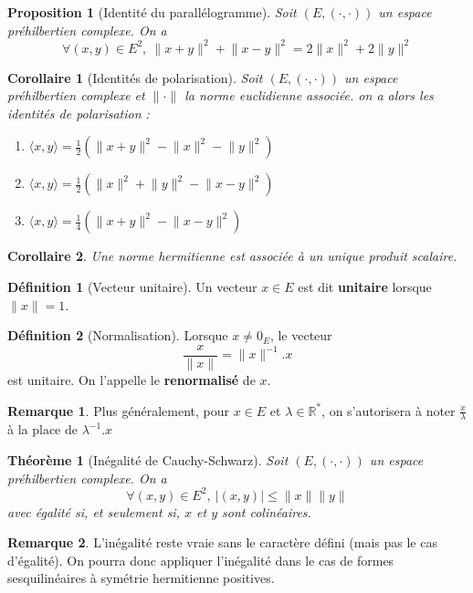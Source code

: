 \documentclass[french]{article}
\newcommand{\R}{\mathbb{R}}
\newcommand{\st}{^*}
\newcommand{\inv}{^{-1}}
\theoremstyle{plain}
\newtheorem{thm}{Théorème}
\newtheorem{prop}{Proposition}
\newtheorem{cor}{Corollaire}
\theoremstyle{definition}
\newtheorem{dfn}{Définition}
\newtheorem{rmq}{Remarque}
\begin{document}
\begin{prop}[Identité du parallélogramme]
	Soit $(E,(\cdot,\cdot))$ un espace préhilbertien complexe. On a $$\forall (x,y)\in E^2,\ \lVert x+y\rVert^2+\lVert x-y\rVert^2=2\lVert x\rVert^2+2\lVert y\rVert^2$$
\end{prop}
\begin{cor}[Identités de polarisation]
	Soit $(E,(\cdot,\cdot))$ un espace préhilbertien complexe et $\lVert\cdot\rVert$ la norme euclidienne associée. on a alors les identités de polarisation :
	\begin{enumerate}
		\item $\displaystyle \langle x,y\rangle =\frac12\left(\lVert x+y\rVert^2-\lVert x\rVert^2-\lVert y\rVert^2\right)$
		\item $\displaystyle \langle x,y\rangle =\frac12\left(\lVert x\rVert^2+\lVert y\rVert^2-\lVert x-y\rVert^2\right)$
		\item $\displaystyle \langle x,y\rangle =\frac14\left(\lVert x+y\rVert^2-\lVert x-y\rVert^2\right)$
	\end{enumerate}
\end{cor}
\begin{cor}
	Une  norme hermitienne est associée à un unique produit scalaire.
\end{cor}
\begin{dfn}[Vecteur unitaire]
	Un vecteur $x\in E$ est dit \textbf{unitaire} lorsque $\lVert x\rVert=1$.
\end{dfn}
\begin{dfn}[Normalisation]
	Lorsque $x\ne 0_E$, le vecteur $$\frac{x}{\lVert x\rVert}=\lVert x\rVert\inv.x$$ est unitaire. On l'appelle le \textbf{renormalisé} de $x$.
\end{dfn}
\begin{rmq} Plus généralement, pour $x\in E$ et $\lambda\in\R\st$, on s'autorisera à noter $\displaystyle \frac{x}{\lambda}$ à la place de $\lambda\inv.x$ \end{rmq}
\begin{thm}[Inégalité de Cauchy-Schwarz]
	Soit $(E,(\cdot,\cdot))$ un espace préhilbertien complexe. On a $$\forall(x,y)\in E^2,\ \lvert(x,y)\rvert \leqslant\lVert x\rVert \lVert y\rVert$$ avec égalité si, et seulement si, $x$ et $y$ sont colinéaires.
\end{thm}
\begin{rmq} L'inégalité reste vraie sans le caractère défini (mais pas le cas d'égalité). On pourra donc appliquer l'inégalité dans le cas de formes sesquilinéaires à symétrie hermitienne positives. \end{rmq}
\end{document}
